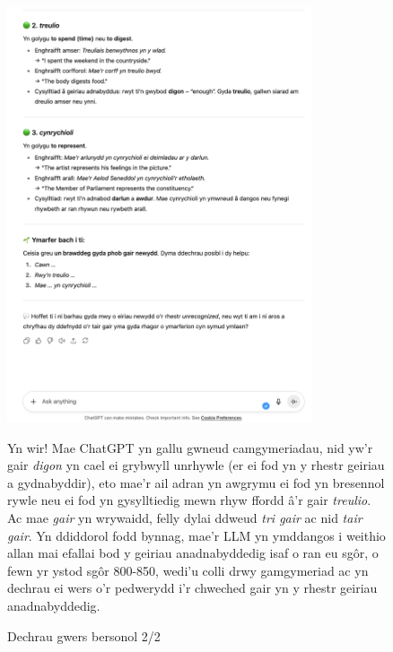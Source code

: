 \begin{figure}[h]
    \centering
    \includegraphics[width=0.8\textwidth]{figures/lesson-2.png}
    \caption{Dechrau gwers bersonol 2/2}
    \label{fig:lesson2}
    \medskip
    \small
    Yn wir! Mae ChatGPT yn gallu gwneud camgymeriadau, nid yw'r gair \textit{digon} yn cael ei grybwyll unrhywle (er ei fod yn y rhestr geiriau a gydnabyddir), eto mae'r ail adran yn awgrymu ei fod yn bresennol rywle neu ei fod yn gysylltiedig mewn rhyw ffordd â'r gair \textit{treulio}. Ac mae \textit{gair} yn wrywaidd, felly dylai ddweud \textit{tri gair} ac nid \textit{tair gair}. Yn ddiddorol fodd bynnag, mae'r LLM yn ymddangos i weithio allan mai efallai bod y geiriau anadnabyddedig isaf o ran eu sgôr, o fewn yr ystod sgôr 800-850, wedi'u colli drwy gamgymeriad ac yn dechrau ei wers o'r pedwerydd i'r chweched gair yn y rhestr geiriau anadnabyddedig.
\end{figure}
